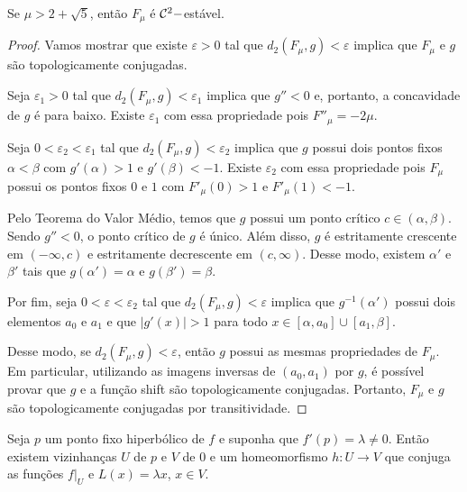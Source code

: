 \begin{theorem}
Se $\mu > 2 + \sqrt{5}$, então $F_\mu$ é $\mathcal{C}^2-$estável.
\end{theorem}

\begin{proof}
Vamos mostrar que existe $\varepsilon > 0$ tal que $d_2(F_\mu, g) < \varepsilon$ implica que $F_\mu$ e $g$ são topologicamente conjugadas.

Seja $\varepsilon_1 > 0$ tal que $d_2(F_\mu, g) < \varepsilon_1$ implica que $g'' < 0$ e, portanto, a concavidade de $g$ é para baixo. Existe $\varepsilon_1$ com essa propriedade pois $F''_\mu = -2\mu$. 

Seja $0 < \varepsilon_2 < \varepsilon_1$ tal que $d_2(F_\mu, g) < \varepsilon_2$ implica que $g$ possui dois pontos fixos $\alpha < \beta$ com $g'(\alpha) > 1$ e $g'(\beta) < -1$. Existe $\varepsilon_2$ com essa propriedade pois $F_\mu$ possui os pontos fixos $0$ e $1$ com $F'_\mu(0) > 1$ e $F'_\mu(1) < -1$.

Pelo Teorema do Valor Médio, temos que $g$ possui um ponto crítico $c \in (\alpha, \beta)$. Sendo $g'' < 0$, o ponto crítico de $g$ é único. Além disso, $g$ é estritamente crescente em $(-\infty, c)$ e estritamente decrescente em $(c, \infty)$. Desse modo, existem $\alpha'$ e $\beta'$ tais que $g(\alpha') = \alpha$ e $g(\beta') = \beta$.

Por fim, seja $0 < \varepsilon < \varepsilon_2$ tal que $d_2(F_\mu, g) < \varepsilon$ implica que $g^{-1}(\alpha')$ possui dois elementos $a_0$ e $a_1$ e que $|g'(x)| > 1$ para todo $x \in [\alpha, a_0] \cup [a_1, \beta]$.

Desse modo, se $d_2(F_\mu, g) < \varepsilon$, então $g$ possui as mesmas propriedades de $F_\mu$. Em particular, utilizando as imagens inversas de $(a_0, a_1)$ por $g$, é possível provar que $g$ e a função shift são topologicamente conjugadas. Portanto, $F_\mu$ e $g$ são topologicamente conjugadas por transitividade.
\end{proof}

\begin{theorem}[Hartman]
Seja $p$ um ponto fixo hiperbólico de $f$ e suponha que $f'(p) = \lambda \neq 0$. Então existem vizinhanças $U$ de $p$ e $V$ de $0$ e um homeomorfismo $h:U \to V$ que conjuga as funções $f|_U$ e $L(x) = \lambda x$, $x \in V$. 
\end{theorem}













